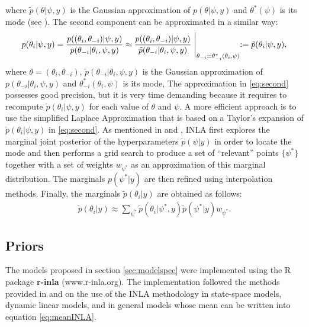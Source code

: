 \documentclass[12pt]{amsart}
\theoremstyle{plain}
\theoremstyle{definition}
\theoremstyle{remark}
\newcommand{\jeg}[1]{\color{ProcessBlue}\textbf{[JEG: #1]}\normalcolor}
\begin{document}
where $\tilde p(\theta|\psi,y)$ is the Gaussian approximation of
$p(\theta|\psi,y)$ and $\theta^*(\psi)$ is its mode (see \cite{Rue2009}). The
second component can be approximated in a similar way:
\begin{equation}\label{eq:second}
  p(\theta_i|\psi,y)  =\frac{p((\theta_i,\theta_{-i})|\psi,y)}{p(\theta_{-i}|\theta_i,\psi,y)} %
   \approx \frac{p((\theta_i,\theta_{-i})|\psi,y)}{\tilde p(\theta_{-i}|\theta_i,\psi,y)} \Biggm |_{\theta_{-i}=\theta_{-i}^*(\theta_i,\psi)}:=\tilde p(\theta_i|\psi,y),
\end{equation}
where $\theta=(\theta_i,\theta_{-i})$, $\tilde p(\theta_{-i}|\theta_i,\psi,y)$ is the Gaussian approximation of
$p(\theta_{-i}|\theta_i,\psi,y)$ and $\theta_{-i}^*(\theta_i,\psi)$ is its mode,  
The approximation in \eqref{eq:second} possesses good precision, but it is very time demanding because it
requires to recompute $\tilde p(\theta_i|\psi,y)$ for each value of $\theta$ and $\psi$. A
more efficient approach is to use the simplified Laplace Approximation that is
based on a Taylor's expansion of $\tilde p(\theta_i|\psi,y)$ in 
\eqref{eq:second}. As mentioned in \cite{Rue2009} and \cite{Blangiardo2013},
INLA first explores the marginal joint posterior of the hyperparameters $\tilde
p(\psi | y)$ in order to locate the mode and then performs a grid search to 
produce a set of ``relevant'' points $\{\psi^*\}$ together with a set of weights
$w_{\psi^*}$ as an approximation of this marginal distribution. The marginals
$p(\psi^*|y)$ are then refined using interpolation methods. Finally, the marginals
$\tilde p(\theta_i|y)$ are obtained as follows:
\begin{align*}
  \tilde p(\theta_i|y) \approx \sum_{\psi^*}\tilde p(\theta_i|\psi^*,y)\tilde p(\psi^*|y)w_{\psi^*}.
\end{align*}

\subsection{Priors}
The models proposed in section \ref{sec:modelspec} were
implemented using the R package \textbf{r-inla} (www.r-inla.org). The
implementation followed the methods provided in \cite{Ruiz-Cardenas2012} and
\cite{Muff2015} on the use of the INLA methodology in state-space models,
dynamic linear models, and in general models whose mean can be written
into equation \eqref{eq:meanINLA}.

\end{document}
